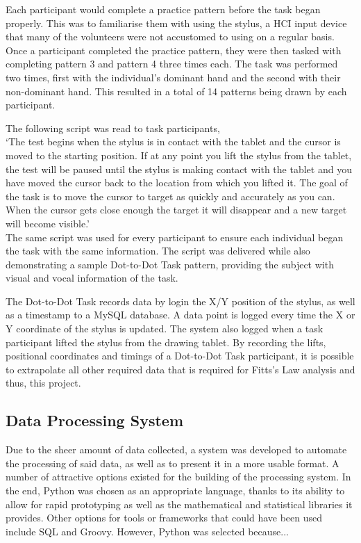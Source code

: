 		Each participant would complete a practice pattern before the task began properly. This was to familiarise them with using the stylus, a HCI input device that many of the volunteers were not accustomed to using on a regular basis. Once a participant completed the practice pattern, they were then tasked with completing pattern 3 and pattern 4 three times each. The task was performed two times, first with the individual's dominant hand and the second with their non-dominant hand. This resulted in a total of 14 patterns being drawn by each participant.
	
		The following script was read to task participants,\\
	
		‘The test begins when the stylus is in contact with the tablet and the cursor is moved to the starting position. If at any point you lift the stylus from the tablet, the test will be paused until the stylus is making contact with the tablet and you have moved the cursor back to the location from which you lifted it. The goal of the task is to move the cursor to target as quickly and accurately as you can. When the cursor gets close enough the target it will disappear and a new target will become visible.’\\
	
		The same script was used for every participant to ensure each individual began the task with the same information. The script was delivered while also demonstrating a sample Dot-to-Dot Task pattern, providing the subject with visual and vocal information of the task. 
	
		The Dot-to-Dot Task records data by login the X/Y position of the stylus, as well as a timestamp to a MySQL database. A data point is logged every time the X or Y coordinate of the stylus is updated. The system also logged when a task participant lifted the stylus from the drawing tablet. By recording the lifts, positional coordinates and timings of a Dot-to-Dot Task participant, it is possible to extrapolate all other required data that is required for Fitts’s Law analysis and thus, this project.
	
	\subsection{Data Processing System}
		Due to the sheer amount of data collected, a system was developed to automate the processing of said data, as well as to present it in a more usable format. A number of attractive options existed for the building of the processing system. In the end, Python was chosen as an appropriate language, thanks to its ability to allow for rapid prototyping as well as the mathematical and statistical libraries it provides.  Other options for tools or frameworks that could have been used include SQL and Groovy. However, Python was selected because...
		
